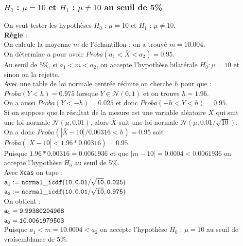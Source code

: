 \documentclass[a4paper,11pt]{book}
\begin{document}
\subsubsection{$H_0$ : $\mu=10$ et $H_1$ :  $\mu\neq 10$ au  seuil de 5\%}
On veut tester les hypoth\`eses $H_0$ : $\mu=10$ et 
 $H_1$ : $\mu \neq 10$.\\
{\bf R\`egle} :\\
On calcule  la moyenne $m$ de l'\'echantillon : on a trouv\'e $m=10.004$.\\
On d\'etermine $a$ pour avoir $Proba(a_1<\bar X<a_2)=0.95$.\\
Au seuil de 5\%, si $a_1<m<a_2$, on accepte l'hypoth\`ese bilat\'erale 
$H_0 : \mu=10$  et sinon on la rejette.\\
Avec une table de loi normale centr\'ee r\'eduite on cherche $h$ pour que :\\
$Proba(Y<h)=0.975$ lorsque $Y\in \mathcal N(0,1)$ et on trouve $h=1.96$.\\
On a aussi $Proba(Y<-h)=0.025$ et donc $Proba(-h<Y<h)=0.95$.\\
Si on suppose que le r\'esultat de la mesure est une variable al\'eatoire $X$
qui suit une loi normale $\mathcal N(\mu,0.01)$, alors $\bar X$ suit une
loi normale $\mathcal N(\mu,0.01/\sqrt{10})$.\\ 
On a donc $Proba(|\bar X-10|/0.00316<h)=0.95$ soit \\
$Proba(|\bar X-10|<1.96*0.00316)=0.95$.\\
Puisque $1.96*0.00316=0.0061936$ et que $|m-10|=0.0004<0.0061936$ on accepte 
l'hypoth\`ese $H_0$ au seuil de 5\%.\\
Avec {\tt Xcas} on tape :\\
${\tt a_1:=normal\_icdf(10,0.01/\sqrt{10},0.025)}$\\
${\tt a_2:=normal\_icdf(10,0.01/\sqrt{10},0.975)}$\\
On obtient :\\
${\tt a_1=9.99380204968}$\\
${\tt a_2=10.0061979503}$\\
Puisque $a_1<m=10.0004<a_2$ on accepte l'hypoth\`ese $H_0$ : $\mu=10$
au seuil de vraisemblance de 5\%.
\end{document}
